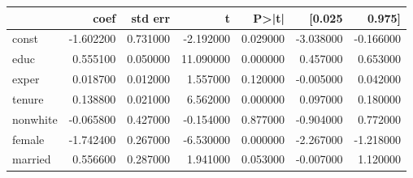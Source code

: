 \begin{tabular}{lrrrrrr}
\toprule
 & coef & std err & t & P>|t| & [0.025 & 0.975] \\
\midrule
const & -1.602200 & 0.731000 & -2.192000 & 0.029000 & -3.038000 & -0.166000 \\
educ & 0.555100 & 0.050000 & 11.090000 & 0.000000 & 0.457000 & 0.653000 \\
exper & 0.018700 & 0.012000 & 1.557000 & 0.120000 & -0.005000 & 0.042000 \\
tenure & 0.138800 & 0.021000 & 6.562000 & 0.000000 & 0.097000 & 0.180000 \\
nonwhite & -0.065800 & 0.427000 & -0.154000 & 0.877000 & -0.904000 & 0.772000 \\
female & -1.742400 & 0.267000 & -6.530000 & 0.000000 & -2.267000 & -1.218000 \\
married & 0.556600 & 0.287000 & 1.941000 & 0.053000 & -0.007000 & 1.120000 \\
\bottomrule
\end{tabular}
